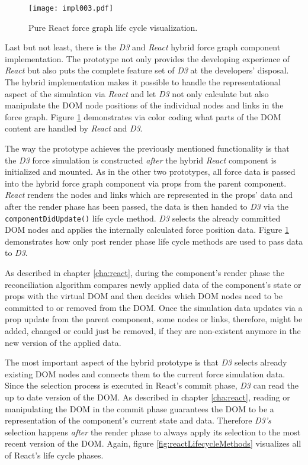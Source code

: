 \begin{figure}
\centering
\texttt{[image: impl003.pdf]}
\caption{Pure React force graph life cycle visualization.}
\label{fig:reactD3HybridLifeCycle}
\end{figure}

Last but not least, there is the \emph{D3} and \emph{React} hybrid force graph component implementation. The prototype not only provides the developing experience of \emph{React} but also puts the complete feature set of \emph{D3} at the developers' disposal. The hybrid implementation makes it possible to handle the representational aspect of the simulation via \emph{React} and let \emph{D3} not only calculate but also manipulate the DOM node positions of the individual nodes and links in the force graph. Figure \ref{fig:reactD3HybridLifeCycle} demonstrates via color coding what parts of the DOM content are handled by \emph{React} and \emph{D3}. 

The way the prototype achieves the previously mentioned functionality is that the \emph{D3} force simulation is constructed \emph{after} the hybrid \emph{React} component is initialized and mounted. As in the other two prototypes, all force data is passed into the hybrid force graph component via props from the parent component. \emph{React} renders the nodes and links which are represented in the props' data and after the render phase has been passed, the data is then handed to \emph{D3} via the \texttt{componentDidUpdate()} life cycle method. \emph{D3} selects the already committed DOM nodes and applies the internally calculated force position data. Figure \ref{fig:reactD3HybridLifeCycle} demonstrates how only post render phase life cycle methods are used to pass data to \emph{D3}.

As described in chapter \ref{cha:react}, during the component's render phase the reconciliation algorithm compares newly applied data of the component's state or props with the virtual DOM and then decides which DOM nodes need to be committed to or removed from the DOM. Once the simulation data updates via a prop update from the parent component, some nodes or links, therefore, might be added, changed or could just be removed, if they are non-existent anymore in the new version of the applied data.

The most important aspect of the hybrid prototype is that \emph{D3} selects already existing DOM nodes and connects them to the current force simulation data. Since the selection process is executed in React's commit phase, \emph{D3} can read the up to date version of the DOM. As described in chapter \ref{cha:react}, reading or manipulating the DOM in the commit phase guarantees the DOM to be a representation of the component's current state and data. Therefore \emph{D3's} selection happens \emph{after} the render phase to always apply its selection to the most recent version of the DOM. Again, figure \ref{fig:reactLifecycleMethods} visualizes all of React's life cycle phases.

